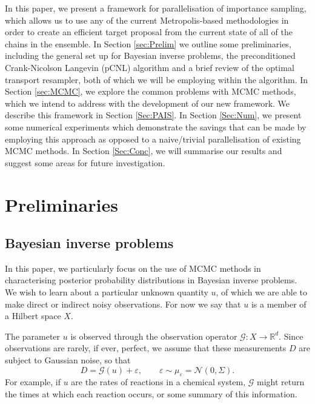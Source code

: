 \documentclass[final]{siamltex}
\newcommand{\G}{\mathcal{G}}
\newcommand{\data}{D}
\begin{document}
In this paper, we present a framework for parallelisation of
importance sampling, which allows us to use any of the current
Metropolis-based methodologies in order to create an efficient target
proposal from the current state of all of the chains in the
ensemble. In Section \ref{sec:Prelim} we outline some preliminaries,
including the general set up for Bayesian inverse problems, the
preconditioned Crank-Nicolson Langevin (pCNL) algorithm and a
brief review of the optimal transport resampler,  both of which we will be
employing within the algorithm. In Section \ref{sec:MCMC}, we explore the common problems with MCMC
methods, which we intend to address with the development of our new
framework. We describe this framework in Section \ref{Sec:PAIS}. In
Section \ref{Sec:Num}, we present some numerical experiments which
demonstrate the savings that can be made by employing this approach as
opposed to a naive/trivial parallelisation of existing MCMC
methods. In Section \ref{Sec:Conc}, we will summarise our results and
suggest some areas for future investigation.










\section{Preliminaries}
\subsection{Bayesian inverse problems}
In this paper, we particularly focus on the use of MCMC methods in characterising
posterior probability distributions in Bayesian inverse problems. We
wish to learn about a particular unknown quantity $u$, of which we are
able to make direct or indirect noisy observations. For now
we say that $u$ is a member of a Hilbert
space $X$. 

The parameter $u$ is observed
through the observation operator $\mathcal{G}:X \to
\mathbb{R}^d$. Since observations are rarely, if ever, perfect, we
assume that these measurements $\data$ are subject to Gaussian noise, so that
\begin{equation}\label{eqn:obs}
	\data = \mathcal{G}(u) + \varepsilon, \qquad \varepsilon \sim \mu_{\varepsilon} = \mathcal{N}(0,\Sigma).
\end{equation}
For example, if $u$ are the rates of reactions in a chemical system, $\G$ might return the times at which each reaction occurs, or some summary of this information.
\end{document}
